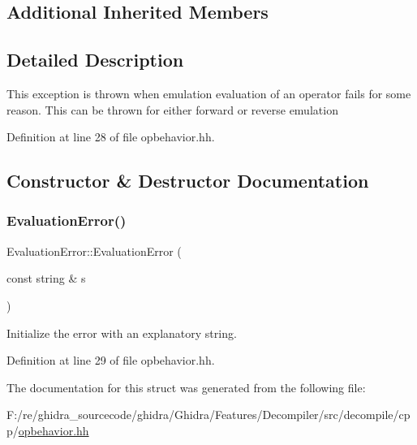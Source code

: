 \subsection*{Additional Inherited Members}


\subsection{Detailed Description}
This exception is thrown when emulation evaluation of an operator fails for some reason. This can be thrown for either forward or reverse emulation 

Definition at line 28 of file opbehavior.\+hh.



\subsection{Constructor \& Destructor Documentation}
\mbox{\label{struct_evaluation_error_af252f4ade5332e2523addf03d68c4ebd}} 
\subsubsection{\texorpdfstring{EvaluationError()}{EvaluationError()}}
{\footnotesize\ttfamily Evaluation\+Error\+::\+Evaluation\+Error (\begin{DoxyParamCaption}\item[{const string \&}]{s }\end{DoxyParamCaption})\hspace{0.3cm}{\ttfamily [inline]}}



Initialize the error with an explanatory string. 



Definition at line 29 of file opbehavior.\+hh.



The documentation for this struct was generated from the following file\+:\begin{DoxyCompactItemize}
\item 
F\+:/re/ghidra\+\_\+sourcecode/ghidra/\+Ghidra/\+Features/\+Decompiler/src/decompile/cpp/\mbox{\hyperlink{opbehavior_8hh}{opbehavior.\+hh}}\end{DoxyCompactItemize}
